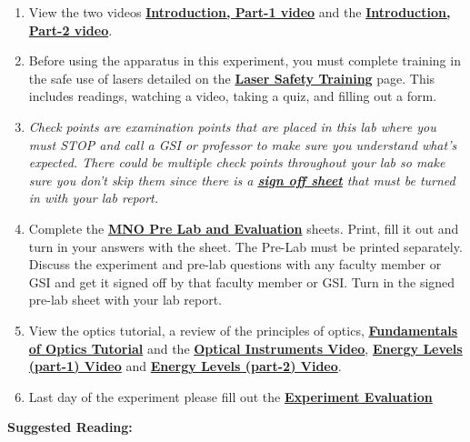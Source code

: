 \documentclass{../lab}
\begin{document}
\begin{enumerate}
    \item View the two videos \href{http://youtu.be/JZJlyaIT3B4}{\textbf{Introduction, Part-1 video}} and the \href{http://youtu.be/h81p2LXkgZY}{\textbf{Introduction, Part-2 video}}.

    \item Before using the apparatus in this experiment, you must complete training in the safe use of lasers detailed on the \href{http://experimentationlab.berkeley.edu/lasersafety}{\textbf{Laser Safety Training}} page. This includes readings, watching a video, taking a quiz, and filling out a form.
    
    \item \emph{Check points are examination points that are placed in this lab where you must STOP and call a GSI or professor to make sure you understand what's expected. There could  be multiple check points throughout your lab so make sure you don't skip them since there is a \href{http://experimentationlab.berkeley.edu/mnocheckpoints}{\textbf{sign off sheet}} that must be turned in with your lab report.}

    \item Complete the \href{http://experimentationlab.berkeley.edu/MNOprelab}{\textbf{MNO Pre Lab and Evaluation}} sheets. Print, fill it out and turn in your answers with the sheet. The Pre-Lab must be printed separately. Discuss the experiment and pre-lab questions with any faculty member or GSI and get it signed off by that faculty member or GSI. Turn in the signed pre-lab sheet with your lab report.

    \item View the optics tutorial, a review of the principles of optics, \href{http://experimentationlab.berkeley.edu/sites/default/files/ATM/fundamental-Optics.pdf}{\textbf{Fundamentals of Optics Tutorial}} and the \href{http://youtu.be/zUGBt5vc5FA}{\textbf{Optical Instruments Video}}, \href{http://youtu.be/wyBOVjU5bBQ}{\textbf{Energy Levels (part-1) Video}} and \href{http://youtu.be/Eypw0DmVBxk}{\textbf{Energy Levels (part-2) Video}}.

    \item Last day of the experiment please fill out the \href{\ExperimentEvaluation}{\textbf{Experiment Evaluation}}

\end{enumerate}

\noindent\textbf{Suggested Reading:}
\end{document}

